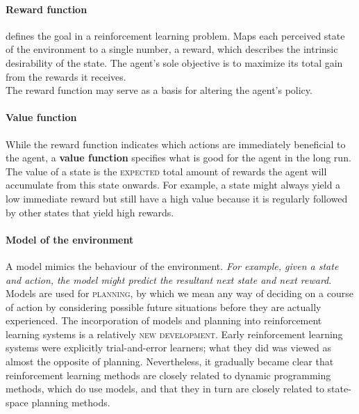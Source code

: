 \documentclass[11pt]{article}
\begin{document}
\paragraph{Reward function}
defines the goal in a reinforcement learning problem. Maps each perceived state of the environment to a single number, a reward, which describes the intrinsic desirability of the state. The agent's sole objective is to maximize its total gain from the rewards it receives.\\
The reward function may serve as a basis for altering the agent's policy.

\paragraph{Value function}
While the reward function indicates which actions are immediately beneficial to the agent, a \textbf{value function} specifies what is good for the agent in the long run. The value of a state is the \textsc{expected} total amount of rewards the agent will accumulate from this state onwards.
For example, a state might always yield a low immediate reward but still have a high value because it is regularly followed by other states that yield high rewards.

\paragraph{Model of the environment}
A model mimics the behaviour of the environment. \textit{For example, given a state and action, the model might predict the resultant next state and next reward}. Models are used for \textsc{planning}, by which we mean any way of deciding on a course of action by considering possible future situations before they are actually experienced. The incorporation of models and planning into reinforcement learning systems is a relatively \textsc{new development}. Early reinforcement learning systems were explicitly trial-and-error learners; what they did was viewed as almost the opposite of planning. Nevertheless, it gradually became clear that reinforcement learning methods are closely related to dynamic programming methods, which do use models, and that they in turn are closely related to state-space planning methods. 

\end{document}
